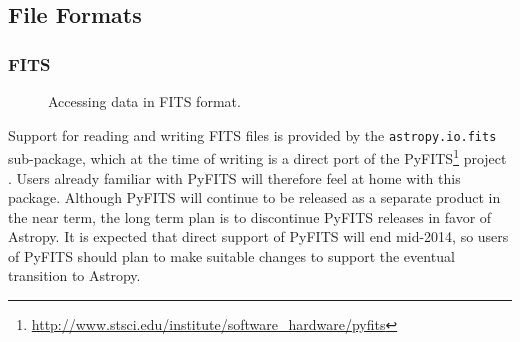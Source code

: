 \documentclass[traditabstract]{aa}
\begin{document}
\subsection{File Formats}

\label{sec:io}

\subsubsection{FITS}


\label{sec:fits}

\begin{figure}
\center
\caption{Accessing data in FITS format.\label{code:fits}}
\vspace{0.1in}
\end{figure}

Support for reading and writing FITS files is provided by the
\texttt{astropy.io.fits} sub-package, which at the time of writing is a direct
port of the
PyFITS\footnote{\url{http://www.stsci.edu/institute/software_hardware/pyfits}}
project \citep{barrett1999pyfits}. Users already familiar with PyFITS will
therefore feel at home with this package. Although PyFITS will continue to be
released as a separate product in the near term, the long term plan is to
discontinue PyFITS releases in favor of Astropy. It is expected that direct
support of PyFITS will end mid-2014, so users of PyFITS should plan to make
suitable changes to support the eventual transition to Astropy.
\end{document}
